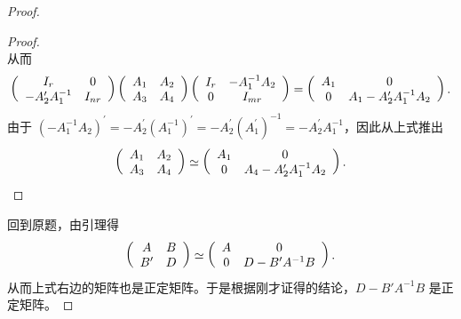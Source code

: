 \begin{enumerate}[1~]
\begin{proof}
\begin{proof}
\[\]
从而\[
\left( \begin{array} { c c } { I _ { r } } & { 0 } \\ { - A _ { 2 } ^ { \prime } A _ { 1 } ^ { - 1 } } & { I _ { n r } } \end{array} \right) \left( \begin{array} { c c } { A _ { 1 } } & { A _ { 2 } } \\ { A _ { 3 } } & { A _ { 4 } } \end{array} \right) \left( \begin{array} { c c } { I _ { r } } & { - A _ { 1 } ^ { - 1 } A _ { 2 } } \\ { 0 } & { I _ { m r } } \end{array} \right) = \left( \begin{array} { c c } { A _ { 1 } } & { 0 } \\ { 0 } & { A _ { 1 } - A _ { 2 } ^ { \prime } A _ { 1 } ^ { - 1 } A _ { 2 } } \end{array} \right).
\]
由于 $ \left( - A _ { 1 } ^ { - 1 } A _ { 2 } \right) ^ { \prime } = - A _ { 2 } ^ { \prime } \left( A _ { 1 } ^ { - 1 } \right) ^ { \prime } = - A _ { 2 } ^ { \prime } \left( A _ { 1 } ^ { \prime } \right) ^ { - 1 } = - A _ { 2 } ^ { \prime } A _ { 1 } ^ { - 1 } $，因此从上式推出\[
\left( \begin{array} { l l } { A _ { 1 } } & { A _ { 2 } } \\ { A _ { 3 } } & { A _ { 4 } } \end{array} \right) \simeq \left( \begin{array} { c c } { A _ { 1 } } & { 0 } \\ { 0 } & { A _ { 4 } - A _ { 2 } ^ { \prime } A _ { 1 } ^ { - 1 } A _ { 2 } } \end{array} \right).
\]
\end{proof}
回到原题，由引理得\[
\left( \begin{array} { c c } { A } & { B } \\ { B ^ { \prime } } & { D } \end{array} \right) \simeq \left( \begin{array} { c c } { A } & { 0 } \\ { 0 } & { D - B ^ { \prime } A ^ { - 1 } B } \end{array} \right).
\]
从而上式右边的矩阵也是正定矩阵。于是根据刚才证得的结论，$D-B'A^{-1}B$ 是正定矩阵。

\end{proof}


\end{enumerate}

